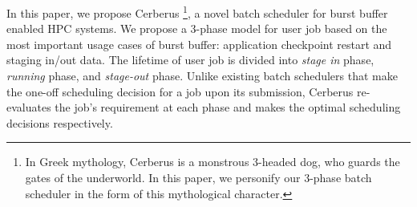 

In this paper, we propose Cerberus
\footnote{In Greek mythology,
Cerberus is a monstrous 3-headed dog,
who guards the gates of the underworld. In this paper, we personify our 3-phase batch scheduler
in the form of this mythological character.
},
a novel batch scheduler for burst buffer enabled HPC systems. 
We propose a 3-phase model for user job 
based on the most important usage cases of burst buffer: 
application checkpoint restart and staging in/out data. 
The lifetime of user job is divided into \textit{stage in} phase, 
\textit{running} phase, and \textit{stage-out} phase. 
Unlike existing batch schedulers that 
make the one-off scheduling decision for a job upon its submission, 
Cerberus re-evaluates the job's requirement at each phase 
and makes the optimal scheduling decisions respectively.

